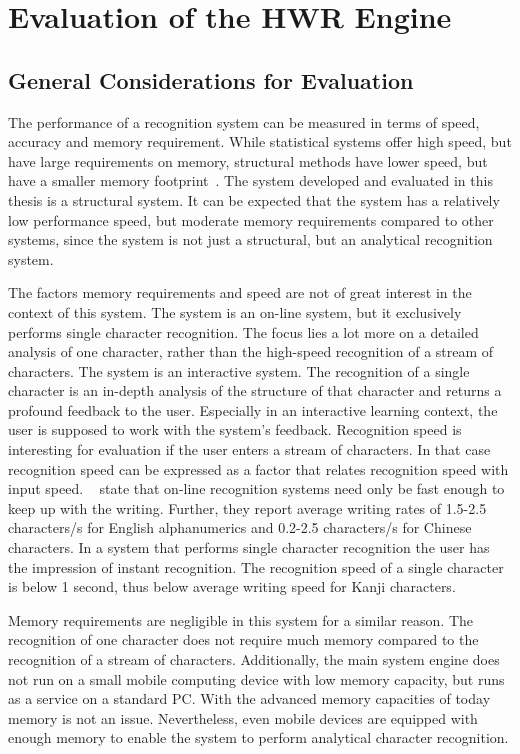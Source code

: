 \section{Evaluation of the HWR Engine}
\label{sec:eval:hwreval}

\subsection{General Considerations for Evaluation}
\label{sec:eval:generalconsiderations}

The performance of a recognition system can be measured in terms of speed,
accuracy and memory requirement.
While statistical systems offer high speed, 
but have large requirements on memory,
structural methods have lower speed, but have a smaller 
memory footprint~.
The system developed and evaluated in this thesis is a structural system.
It can be expected that the system has a relatively low performance speed,
but moderate memory requirements compared to other systems,
since the system is not just a structural, but an analytical
recognition system.

The factors memory requirements and speed are not of great interest in
the context of this system. The system is an on-line system, but it
exclusively performs single character recognition. The focus lies a lot more on
a detailed analysis of one character, rather than the high-speed recognition
of a stream of characters. The system is an interactive system. 
The recognition of a single character is an in-depth analysis of the
structure of that character and returns a profound feedback to the user.
Especially in an interactive learning context, the user is supposed to
work with the system's feedback. Recognition speed is interesting for evaluation
if the user enters a stream of characters. In that case recognition speed
can be expressed as a factor that relates recognition speed with input speed.
~\citeyear{Tappert1990} state that on-line
recognition systems need only be fast enough to keep up with the writing. 
Further, they report average writing rates of  1.5-2.5  characters/s  for 
English  alphanumerics  and 0.2-2.5  characters/s  for  Chinese  characters.  
In a system that performs single character recognition the user has the 
impression of instant recognition. The recognition speed of a single character 
is below 1 second, thus below average writing speed for Kanji characters. 

Memory requirements are negligible in this system for a similar reason.
The recognition of one character does not require much memory compared to
the recognition of a stream of characters. Additionally, the main system engine
does not run on a small mobile computing device with low memory capacity,
but runs as a service on a standard PC. With the advanced memory capacities
of today memory is not an issue. Nevertheless, even mobile devices are 
equipped with enough memory to enable the system to perform analytical character
recognition.

